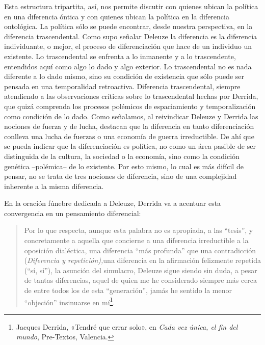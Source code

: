 Esta estructura tripartita, así, nos permite discutir con quienes ubican la política en una diferencia óntica y con quienes ubican la política en la diferencia ontológica. La política sólo se puede encontrar, desde nuestra perspectiva, en la diferencia trascendental. Como supo señalar Deleuze la diferencia es la diferencia individuante, o mejor, el proceso de diferenciación que hace de un individuo un existente. Lo trascendental se enfrenta a lo inmanente y a lo trascendente, entendidos aquí como algo lo dado y algo exterior. Lo trascendental no es nada diferente a lo dado mismo, sino su condición de existencia que sólo puede ser pensada en una temporalidad retroactiva. Diferencia trascendental, siempre atendiendo a las observaciones críticas sobre lo trascendental hechas por Derrida, que quizá comprenda los procesos polémicos de espaciamiento y temporalización como condición de lo dado. Como señalamos, al reivindicar Deleuze y Derrida las nociones de fuerza y de lucha, destacan que la diferencia en tanto diferenciación conlleva una lucha de fuerzas o una economía de guerra irreductible. De ahí que se pueda indicar que la diferenciación es política, no como un área pasible de ser distinguida de la cultura, la sociedad o la economía, sino como la condición genética --polémica-- de lo existente. Por esto mismo, lo cual es más difícil de pensar, no se trata de tres nociones de diferencia, sino de una complejidad inherente a la misma diferencia.

En la oración fúnebre dedicada a Deleuze, Derrida va a acentuar esta convergencia en un pensamiento diferencial:

\begin{quote}
Por lo que respecta, aunque esta palabra no es apropiada, a las ``tesis'', y concretamente a aquella que concierne a una diferencia irreductible a la oposición dialéctica, una diferencia ``más profunda'' que una contradicción (\emph{Diferencia y repetición),}una diferencia en la afirmación felizmente repetida (``sí, sí''), la asunción del simulacro, Deleuze sigue siendo sin duda, a pesar de tantas diferencias, aquel de quien me he considerado siempre más cerca de entre todos los de esta ``generación'', jamás he sentido la menor ``objeción'' insinuarse en mí\footnote{Jacques Derrida, «Tendré que errar solo», en \emph{Cada vez única, el fin del mundo}, Pre-Textos, Valencia.}.
\end{quote}

